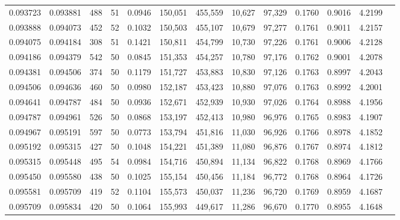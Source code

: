 \begin{tabular}{rrrrrrrrrrrrr}
0.093723 & 0.093881 &   488 &  51 &                                     0.0946 & 150,051 & 455,559 &  10,627 &  97,329 & 0.1760 & 0.9016 & 4.2199 \\
0.093888 & 0.094073 &   452 &  52 &                                     0.1032 & 150,503 & 455,107 &  10,679 &  97,277 & 0.1761 & 0.9011 & 4.2157 \\
0.094075 & 0.094184 &   308 &  51 &                                     0.1421 & 150,811 & 454,799 &  10,730 &  97,226 & 0.1761 & 0.9006 & 4.2128 \\
0.094186 & 0.094379 &   542 &  50 &                                     0.0845 & 151,353 & 454,257 &  10,780 &  97,176 & 0.1762 & 0.9001 & 4.2078 \\
0.094381 & 0.094506 &   374 &  50 &                                     0.1179 & 151,727 & 453,883 &  10,830 &  97,126 & 0.1763 & 0.8997 & 4.2043 \\
0.094506 & 0.094636 &   460 &  50 &                                     0.0980 & 152,187 & 453,423 &  10,880 &  97,076 & 0.1763 & 0.8992 & 4.2001 \\
0.094641 & 0.094787 &   484 &  50 &                                     0.0936 & 152,671 & 452,939 &  10,930 &  97,026 & 0.1764 & 0.8988 & 4.1956 \\
0.094787 & 0.094961 &   526 &  50 &                                     0.0868 & 153,197 & 452,413 &  10,980 &  96,976 & 0.1765 & 0.8983 & 4.1907 \\
0.094967 & 0.095191 &   597 &  50 &                                     0.0773 & 153,794 & 451,816 &  11,030 &  96,926 & 0.1766 & 0.8978 & 4.1852 \\
0.095192 & 0.095315 &   427 &  50 &                                     0.1048 & 154,221 & 451,389 &  11,080 &  96,876 & 0.1767 & 0.8974 & 4.1812 \\
0.095315 & 0.095448 &   495 &  54 &                                     0.0984 & 154,716 & 450,894 &  11,134 &  96,822 & 0.1768 & 0.8969 & 4.1766 \\
0.095450 & 0.095580 &   438 &  50 &                                     0.1025 & 155,154 & 450,456 &  11,184 &  96,772 & 0.1768 & 0.8964 & 4.1726 \\
0.095581 & 0.095709 &   419 &  52 &                                     0.1104 & 155,573 & 450,037 &  11,236 &  96,720 & 0.1769 & 0.8959 & 4.1687 \\
0.095709 & 0.095834 &   420 &  50 &                                     0.1064 & 155,993 & 449,617 &  11,286 &  96,670 & 0.1770 & 0.8955 & 4.1648 \\

\end{tabular}
